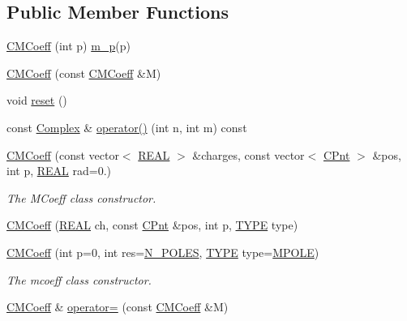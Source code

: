 \subsection*{Public Member Functions}
\begin{DoxyCompactItemize}
\item 
\hyperlink{classCMCoeff_adba776bf8062ab89f60588c138fd562e}{C\-M\-Coeff} (int p) \hyperlink{classCMCoeff_adf49f0bd55b7c496b887f547695aba38}{m\-\_\-p}(p)
\item 
\hyperlink{classCMCoeff_ae5a7fcbb8f989dbbff71d79738fd9356}{C\-M\-Coeff} (const \hyperlink{classCMCoeff}{C\-M\-Coeff} \&M)
\item 
void \hyperlink{classCMCoeff_a2cca0942d27c02cf846810bf465f7ebb}{reset} ()
\item 
const \hyperlink{util_8h_a0ef19d29521fc1e3356ea268ba175cfc}{Complex} \& \hyperlink{classCMCoeff_ae408956538bebea8ad276df0026b2af2}{operator()} (int n, int m) const 
\item 
\hyperlink{classCMCoeff_aee6ebc4dd1ad9096babcaba957db66c7}{C\-M\-Coeff} (const vector$<$ \hyperlink{util_8h_a5821460e95a0800cf9f24c38915cbbde}{R\-E\-A\-L} $>$ \&charges, const vector$<$ \hyperlink{classCPnt}{C\-Pnt} $>$ \&pos, int p, \hyperlink{util_8h_a5821460e95a0800cf9f24c38915cbbde}{R\-E\-A\-L} rad=0.)
\begin{DoxyCompactList}\small\item\em The M\-Coeff class constructor. \end{DoxyCompactList}\item 
\hyperlink{classCMCoeff_a44f54126d3f90484420f1baf14ed491f}{C\-M\-Coeff} (\hyperlink{util_8h_a5821460e95a0800cf9f24c38915cbbde}{R\-E\-A\-L} ch, const \hyperlink{classCPnt}{C\-Pnt} \&pos, int p, \hyperlink{classCMCoeff_a0b490eeb5ba86bc1a95ea1c3b2946478}{T\-Y\-P\-E} type)
\item 
\hyperlink{classCMCoeff_a52820257419417dd2d18a75e276fd011}{C\-M\-Coeff} (int p=0, int res=\hyperlink{mcoeff_8h_ac23f9c13c5d07d9ce386f7a830c35e5a}{N\-\_\-\-P\-O\-L\-E\-S}, \hyperlink{classCMCoeff_a0b490eeb5ba86bc1a95ea1c3b2946478}{T\-Y\-P\-E} type=\hyperlink{classCMCoeff_a0b490eeb5ba86bc1a95ea1c3b2946478a44c2e68e32e879f210aab9493a0fb48d}{M\-P\-O\-L\-E})
\begin{DoxyCompactList}\small\item\em The mcoeff class constructor. \end{DoxyCompactList}\item 
\hyperlink{classCMCoeff}{C\-M\-Coeff} \& \hyperlink{classCMCoeff_a92c5e5e988695c301c47e3212930a68f}{operator=} (const \hyperlink{classCMCoeff}{C\-M\-Coeff} \&M)

\end{DoxyCompactItemize}
